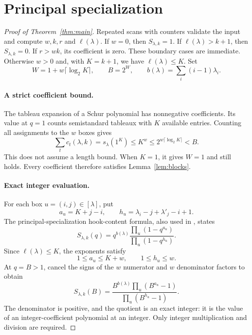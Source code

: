 \documentclass[11pt]{article}
\newcommand{\len}{\ell}
\begin{document}
\section{Principal specialization}
\begin{proof}[Proof of Theorem~\ref{thm:main}]
Repeated scans with counters validate the input and compute $w,k,r$
and $\len(\lambda)$. If $w=0$, then $S_{\lambda,k}=1$. If
$\len(\lambda)>k+1$, then $S_{\lambda,k}=0$. If $r>wk$, its coefficient
is zero. These boundary cases are immediate. Otherwise $w>0$ and,
with $K=k+1$, we have $\len(\lambda)\leq K$. Set
\begin{equation}\label{eq:params}
W=1+w\lceil\log_2K\rceil,\qquad B=2^W,\qquad
b(\lambda)=\sum_i(i-1)\lambda_i.
\end{equation}

\paragraph{A strict coefficient bound.}
The tableau expansion of a Schur polynomial has nonnegative
coefficients. Its value at $q=1$ counts semistandard tableaux with
$K$ available entries. Counting all assignments to the $w$ boxes gives
\begin{equation}\label{eq:bound}
\sum_t c_t(\lambda,k)=s_\lambda(1^K)
\leq K^w\leq2^{w\lceil\log_2K\rceil}<B.
\end{equation}
This does not assume a length bound. When $K=1$, it gives $W=1$ and
still holds. Every coefficient therefore satisfies
Lemma~\ref{lem:blocks}.

\paragraph{Exact integer evaluation.}
For each box $u=(i,j)\in[\lambda]$, put
\[
a_u=K+j-i,\qquad h_u=\lambda_i-j+\lambda'_j-i+1.
\]
The principal-specialization hook-content formula, also used in
\cite[\S6]{GIP}, states
\[
S_{\lambda,k}(q)=q^{b(\lambda)}
\frac{\prod_u(1-q^{a_u})}{\prod_u(1-q^{h_u})}.
\]
Since $\len(\lambda)\leq K$, the exponents satisfy
\begin{equation}\label{eq:positive}
1\leq a_u\leq K+w,\qquad1\leq h_u\leq w.
\end{equation}
At $q=B>1$, cancel the signs of the $w$ numerator and $w$ denominator
factors to obtain
\begin{equation}\label{eq:quotient}
S_{\lambda,k}(B)=
\frac{B^{b(\lambda)}\prod_u(B^{a_u}-1)}
{\prod_u(B^{h_u}-1)}.
\end{equation}
The denominator is positive, and the quotient is an exact integer:
it is the value of an integer-coefficient polynomial at an integer.
Only integer multiplication and division are required.


\end{proof}
\end{document}
